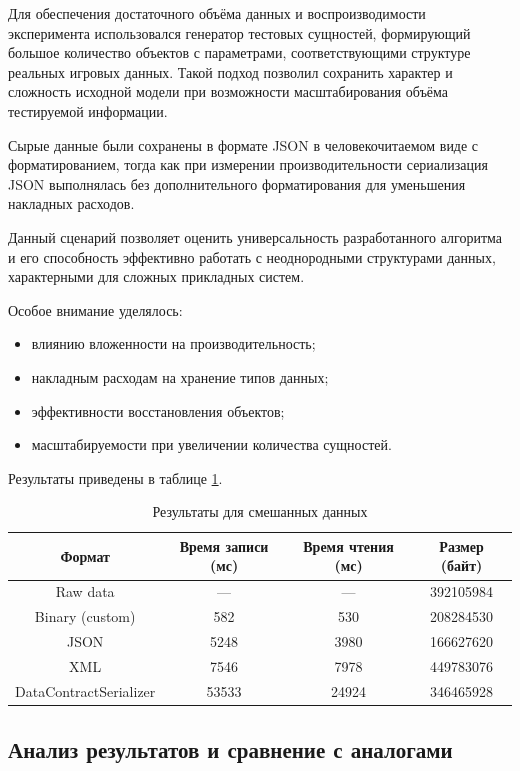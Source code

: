 \documentclass[coursework]{SCWorks}
\begin{document}
Для обеспечения достаточного объёма данных и воспроизводимости эксперимента использовался генератор тестовых сущностей, формирующий большое количество объектов с параметрами, соответствующими структуре реальных игровых данных. Такой подход позволил сохранить характер и сложность исходной модели при возможности масштабирования объёма тестируемой информации.

Сырые данные были сохранены в формате JSON в человекочитаемом виде с форматированием, тогда как при измерении производительности сериализация JSON выполнялась без дополнительного форматирования для уменьшения накладных расходов.

Данный сценарий позволяет оценить универсальность разработанного алгоритма и его способность эффективно работать с неоднородными структурами данных, характерными для сложных прикладных систем.

Особое внимание уделялось:
\begin{itemize}
    \item влиянию вложенности на производительность;
    \item накладным расходам на хранение типов данных;
    \item эффективности восстановления объектов;
    \item масштабируемости при увеличении количества сущностей.
\end{itemize}

Результаты приведены в таблице \ref{tab:mixed_results}.

\begin{table}[h]
\centering
\caption{Результаты для смешанных данных}
\label{tab:mixed_results}
\begin{tabular}{|c|c|c|c|}
\hline
Формат & Время записи (мс) & Время чтения (мс) & Размер (байт) \\ \hline
Raw data & --- & --- & 392105984 \\ \hline
Binary (custom) & 582 & 530 & 208284530 \\ \hline
JSON & 5248 & 3980 & 166627620 \\ \hline
XML & 7546 & 7978 & 449783076 \\ \hline
DataContractSerializer & 53533 & 24924 & 346465928 \\ \hline
\end{tabular}
\end{table}

\subsection{Анализ результатов и сравнение с аналогами}
\end{document}
